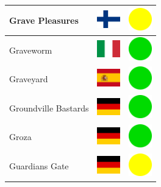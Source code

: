 \documentclass[12pt, a4paper, twoside]{report}
\begin{document}
\begin{center}
\begin{longtable}{|p{5cm}|p{2cm}|p{2cm}|}
Grave Pleasures & \includegraphics[width=1cm]{4x3/fi} & \includegraphics[width=1cm]{likes/m} \\ \hline
Graveworm & \includegraphics[width=1cm]{4x3/it} & \includegraphics[width=1cm]{likes/y} \\ \hline
Graveyard & \includegraphics[width=1cm]{4x3/es} & \includegraphics[width=1cm]{likes/y} \\ \hline
Groundville Bastards & \includegraphics[width=1cm]{4x3/de} & \includegraphics[width=1cm]{likes/y} \\ \hline
Groza & \includegraphics[width=1cm]{4x3/de} & \includegraphics[width=1cm]{likes/y} \\ \hline
Guardians Gate & \includegraphics[width=1cm]{4x3/de} & \includegraphics[width=1cm]{likes/m} \\ \hline

\end{longtable}
\end{center}
\end{document}
